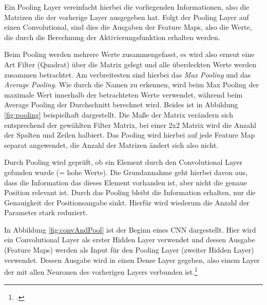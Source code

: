Ein Pooling Layer vereinfacht hierbei die vorliegenden Informationen, also die Matrizen die der vorherige Layer ausgegeben hat. Folgt der Pooling Layer auf einen Convolutional, sind dies die Ausgaben der Feature Maps, also die Werte, die durch die Berechnung der Aktivierungsfunktion erhalten werden.

Beim Pooling werden mehrere Werte zusammengefasst, es wird also erneut eine Art Filter (Quadrat) über die Matrix gelegt und alle überdeckten Werte werden zusammen betrachtet. Am verbreitesten sind hierbei das \textit{Max Pooling} und das \textit{Average Pooling}. Wie durch die Namen zu erkennen, wird beim Max Pooling der maximale Wert innerhalb der betrachteten Werte verwendet, während beim Average Pooling der Durchschnitt berechnet wird. Beides ist in Abbildung \ref{fig:pooling} beispielhaft dargestellt. Die Maße der Matrix verändern sich entsprechend der gewählten Filter Matrix, bei einer 2x2 Matrix wird die Anzahl der Spalten und Zeilen halbiert.
Das Pooling wird hierbei auf jede Feature Map separat angewendet, die Anzahl der Matrizen ändert sich also nicht. 

Durch Pooling wird geprüft, ob ein Element durch den Convolutional Layer gefunden wurde (= hohe Werte). Die Grundannahme geht hierbei davon aus, dass die Information das dieses Element vorhanden ist, aber nicht die genaue Position relevant ist. Durch das Pooling bleibt die Information erhalten, nur die Genauigkeit der Positionsangabe sinkt. Hierfür wird wiederum die Anzahl der Parameter stark reduziert. 

In Abbildung \ref{fig:convAndPool} ist der Beginn eines \ac{CNN} dargestellt. Hier wird ein Convolutional Layer als erster Hidden Layer verwendet und dessen Ausgabe (Feature Maps) werden als Input für den Pooling Layer (zweiter Hidden Layer) verwendet. Dessen Ausgabe wird in einen Dense Layer gegeben, also einem Layer der mit allen Neuronen des vorherigen Layers verbunden ist.\footcite[Vgl.][S. 169-171]{nielsenNeuralNetworksDeep2015}

